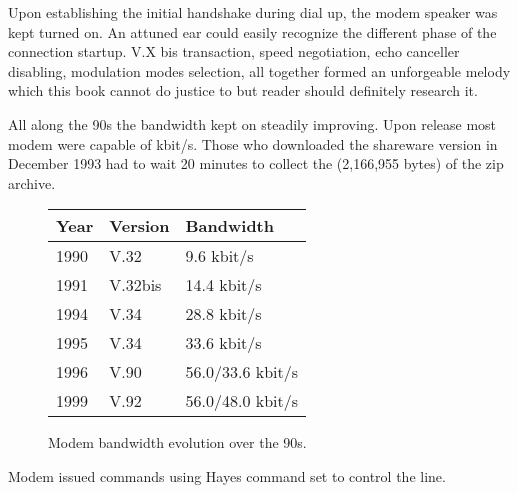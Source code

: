  Upon establishing the initial handshake during dial up, the modem speaker was kept turned on. An attuned ear could easily recognize the different phase of the connection startup. V.X bis transaction, speed negotiation, echo canceller disabling, modulation modes selection, all together formed an unforgeable melody which this book cannot do justice to but reader should definitely research it.\\
 \par 
{}
\par
 \pagebreak
 \par


All along the 90s the bandwidth kept on steadily improving. Upon \doom release most modem were capable of kbit/s. Those who downloaded the shareware version in December 1993 had to wait 20 minutes to collect the (2,166,955 bytes) of the zip archive.\\
\par

 \begin{figure}[H]
\centering  
\begin{tabularx}{\textwidth}{ L{0.2} L{0.3} L{0.5}}
  \toprule
  \textbf{Year} & \textbf{Version} & \textbf{Bandwidth} \\
  \toprule 
   
    1990 & V.32 & 9.6 kbit/s \\
    1991 & V.32bis &  14.4 kbit/s \\
    1994 & V.34 & 28.8 kbit/s \\
    1995 & V.34 & 33.6 kbit/s \\
    1996 & V.90 & 56.0/33.6 kbit/s\\
    1999 & V.92 & 56.0/48.0 kbit/s\\
   
   \toprule
\end{tabularx}
\caption{Modem bandwidth evolution over the 90s.}
\end{figure}



\par
Modem issued commands using Hayes command set to control the line. \\

